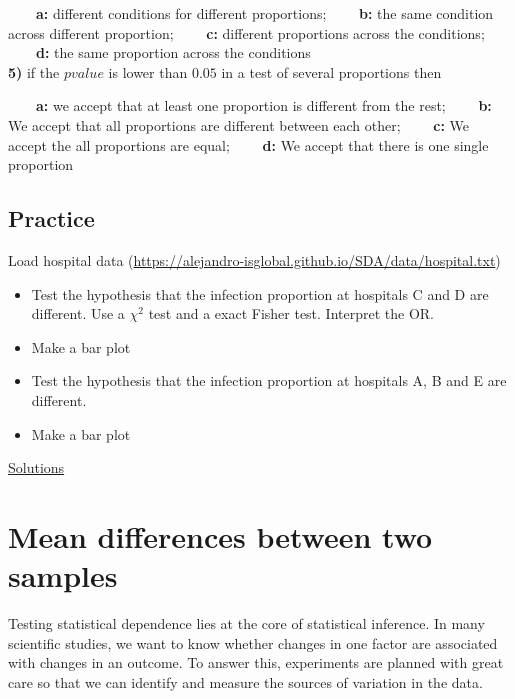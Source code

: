 \documentclass[
]{book}
\begin{document}
\textbf{\(\qquad\)a:} different conditions for different proportions;
\textbf{\(\qquad\)b:} the same condition across different proportion;
\textbf{\(\qquad\)c:} different proportions across the conditions;
\textbf{\(\qquad\)d:} the same proportion across the conditions\\
\textbf{5)} if the \(pvalue\) is lower than \(0.05\) in a test of several proportions then

\textbf{\(\qquad\)a:} we accept that at least one proportion is different from the rest;
\textbf{\(\qquad\)b:} We accept that all proportions are different between each other;
\textbf{\(\qquad\)c:} We accept the all proportions are equal;
\textbf{\(\qquad\)d:} We accept that there is one single proportion

\hypertarget{practice-5}{%
\section{Practice}\label{practice-5}}

Load hospital data (\url{https://alejandro-isglobal.github.io/SDA/data/hospital.txt})

\begin{itemize}
\item
  Test the hypothesis that the infection proportion at hospitals C and D are different. Use a \(\chi^2\) test and a exact Fisher test. Interpret the OR.
\item
  Make a bar plot
\item
  Test the hypothesis that the infection proportion at hospitals A, B and E are different.
\item
  Make a bar plot
\end{itemize}

\href{https://colab.research.google.com/drive/1qHNmibyg9L7v8NcO3HHmknIGxt6_77KK?usp=sharing}{Solutions}

\hypertarget{mean-differences-between-two-samples}{%
\chapter{Mean differences between two samples}\label{mean-differences-between-two-samples}}

Testing statistical dependence lies at the core of statistical inference. In many scientific studies, we want to know whether changes in one factor are associated with changes in an outcome. To answer this, experiments are planned with great care so that we can identify and measure the sources of variation in the data.
\end{document}
